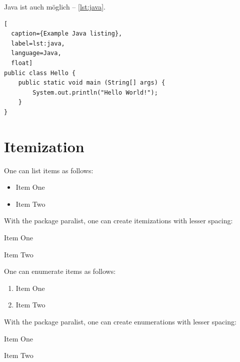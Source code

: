 \documentclass[
  fontsize=10pt,
  numbers=noenddot,
  english,  %
  paper=a5,
  twoside,  %
  DIV=calc,
  headings=small,
  bibliography=totoc,
  listof=totoc,
  draft=false
]{scrbook}
\theoremstyle{break}
\begin{document}
Java ist auch möglich -- \cref{lst:java}.

\begin{ltgexample}
\begin{lstlisting}[
  caption={Example Java listing},
  label=lst:java,
  language=Java,
  float]
public class Hello {
    public static void main (String[] args) {
        System.out.println("Hello World!");
    }
}
\end{lstlisting}
\end{ltgexample}

\section{Itemization}

One can list items as follows:

\begin{ltgexample}
\begin{itemize}
  \item Item One
  \item Item Two
\end{itemize}
\end{ltgexample}

With the package paralist, one can create itemizations with lesser spacing:

\begin{ltgexample}
\begin{compactitem}
  \item Item One
  \item Item Two
\end{compactitem}
\end{ltgexample}

One can enumerate items as follows:

\begin{ltgexample}
\begin{enumerate}
  \item Item One
  \item Item Two
\end{enumerate}
\end{ltgexample}

With the package paralist, one can create enumerations with lesser spacing:

\begin{ltgexample}
\begin{compactenum}
  \item Item One
  \item Item Two
\end{compactenum}
\end{ltgexample}
\end{document}
